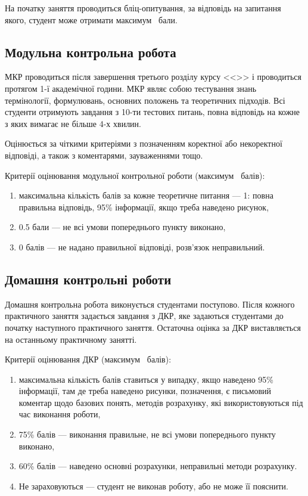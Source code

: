 \documentclass{Syllabus}
\begin{document}
На початку заняття проводиться бліц-опитування, за відповідь на запитання якого, студент може отримати максимум \lecBal~бали.

\subsection*{Модульна контрольна робота}

МКР проводиться після завершення третього розділу курсу <<\discipline>> і проводиться протягом 1-ї академічної години. МКР являє собою тестування знань термінології, формулювань, основних положень та теоретичних підходів. Всі студенти отримують завдання з 10-ти тестових питань, повна відповідь на кожне з яких вимагає не більше 4-х хвилин.

Оцінюється за чіткими критеріями з позначенням коректної або некоректної відповіді, а також з коментарями, зауваженнями тощо.

Критерії оцінювання модульної контрольної роботи (максимум \mkrBal~балів):
\begin{enumerate}[label=$\bullet$]
    \item максимальна кількість балів за кожне теоретичне питання --- 1: повна правильна відповідь, 95\% інформації, якщо треба наведено рисунок, \item 0.5 бали --- не всі умови попереднього пункту виконано,
    \item 0 балів --- не надано правильної відповіді, розв’язок неправильний.
\end{enumerate}

\subsection*{Домашня контрольні роботи}

Домашня контрольна робота виконується студентами поступово. Після кожного практичного заняття задається завдання з ДКР, яке задаються студентами до початку наступного практичного заняття. Остаточна оцінка за ДКР виставляється на останньому практичному  занятті.

Критерії оцінювання ДКР (максимум \rgrBal~балів):
\begin{enumerate}[label=$\bullet$]
    \item максимальна кількість балів ставиться у випадку, якщо наведено 95\% інформації, там де треба наведено рисунки, позначення, є письмовий коментар щодо базових понять, методів розрахунку, які використовуються під час виконання роботи,
    \item 75\% балів --- виконання правильне, не всі умови попереднього пункту виконано,
    \item 60\% балів --- наведено основні розрахунки, неправильні методи розрахунку.
    \item Не зараховуються --- студент не виконав роботу, або не може її пояснити.
\end{enumerate}
\end{document}
